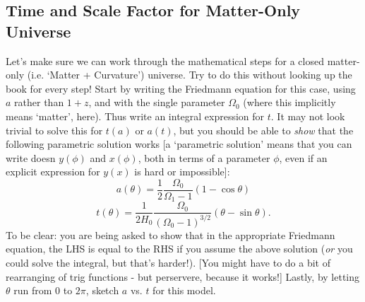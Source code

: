 \subsection*{Time and Scale Factor for Matter-Only Universe}
\begin{tcolorbox}
Let's make sure we can work through the mathematical steps for a closed matter-only (i.e. `Matter + Curvature') universe. Try to do this without looking up the book for every step! Start by writing the Friedmann equation for this case, using $a$ rather than $1+z$, and with the single parameter $\Omega_0$ (where this implicitly means `matter', here). Thus write an integral expression for $t$. It may not look trivial to solve this for $t(a)$ or $a(t)$, but you should be able to \emph{show} that the following parametric solution works [a `parametric solution' means that you can write doesn $y(\phi)$ and $x(\phi)$, both in terms of a parameter $\phi$, even if an explicit expression for $y(x)$ is hard or impossible]:
\begin{equation}\label{parametric_a}
    a(\theta) = \frac{1}{2}\frac{\Omega_0}{\Omega_1 - 1}(1-\cos\theta)
\end{equation}
\begin{equation}\label{parametric_t}
    t(\theta) = \frac{1}{2H_0}\frac{\Omega_0}{(\Omega_0 - 1)^{3/2}}(\theta - \sin\theta).
\end{equation}
To be clear: you are being asked to show that in the appropriate Friedmann equation, the LHS is equal to the RHS if you assume the above solution (\emph{or} you could solve the integral, but that's harder!). [You might have to do a bit of rearranging of trig functions - but perservere, because it works!] Lastly, by letting $\theta$ run from $0$ to $2\pi$, sketch $a$ vs. $t$ for this model. 
\end{tcolorbox}

